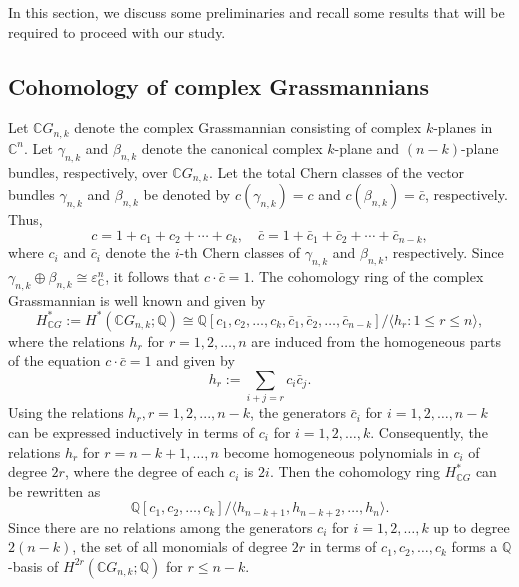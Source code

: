 \documentclass{amsart}
\begin{document}
	In this section, we discuss some preliminaries and recall some results that will be required to proceed with our study.
	
	
	
	
	
	
	
	\subsection{Cohomology of complex Grassmannians}
	
	
	Let $\mathbb{C}G_{n,k}$ denote the complex Grassmannian consisting of complex $k$-planes in $\mathbb{C}^n$. 
	Let $\gamma_{n,k}$ and $\beta_{n,k}$ denote the canonical complex $k$-plane and $(n-k)$-plane bundles, respectively, over $\mathbb{C}G_{n,k}$.
	Let the total Chern classes of the vector bundles $\gamma_{n,k}$ and $\beta_{n,k}$ be denoted by $c(\gamma_{n,k}) = c$ and $c(\beta_{n,k}) = \bar{c}$, respectively. Thus,
	$$c = 1 + c_1 + c_2 + \cdots + c_k, \quad \bar{c} = 1 + \bar{c}_1 + \bar{c}_2 + \cdots + \bar{c}_{n-k},$$
	where $c_i$ and $\bar{c}_i$ denote the $i$-th Chern classes of $\gamma_{n,k}$ and $\beta_{n,k}$, respectively.
	Since $\gamma_{n,k} \oplus \beta_{n,k} \cong \varepsilon_{\mathbb{C}}^n$, it follows that  $c \cdot \bar{c} = 1$.
	The  cohomology ring of the complex Grassmannian is well known and given by  
	$$
	H^*_{\mathbb{C}G}:=H^*(\mathbb{C}G_{n,k};\mathbb{Q}) \cong \mathbb{Q}[c_1, c_2, \dots, c_k, \bar{c}_1, \bar{c}_2, \dots, \bar{c}_{n-k}]/\langle h_r: 1\leq r\leq n\rangle,$$  
	where  the relations $h_r$ for $r = 1, 2, \dots, n$ are induced from the homogeneous parts of the equation $c\cdot \bar c=1$ and given by  
	\[
	h_r := \sum_{i+j=r} c_i \bar{c}_j.
	\]  
	Using the relations $h_r, r=1,2,...,n-k$, the generators $\bar{c}_i$ for $i = 1, 2, \dots, n-k$ can be expressed inductively in terms of $c_i$ for $i = 1, 2, \dots, k$.  Consequently, the relations $h_r$ for $r = n-k+1, \dots, n$ become homogeneous polynomials in $c_i$ of degree $2r$, where the degree of each $c_i$ is $2i$. Then the cohomology ring $H^*_{\mathbb{C}G}$ can be rewritten as  
	\begin{equation}\label{cohomo of grass}
		\mathbb{Q}[c_1, c_2, \dots, c_k]/\langle h_{n-k+1}, h_{n-k+2}, \dots, h_n \rangle.
	\end{equation}
	Since there are no relations among the generators $c_i$ for $i = 1, 2, \dots, k$ up to degree $2(n-k)$, the set of all monomials of degree $2r$ in terms of $c_1, c_2, \ldots, c_k$ forms a $\mathbb{Q}$-basis of $H^{2r}(\mathbb{C}G_{n,k};\mathbb{Q})$ for $r \leq n-k$.
	
\end{document}
